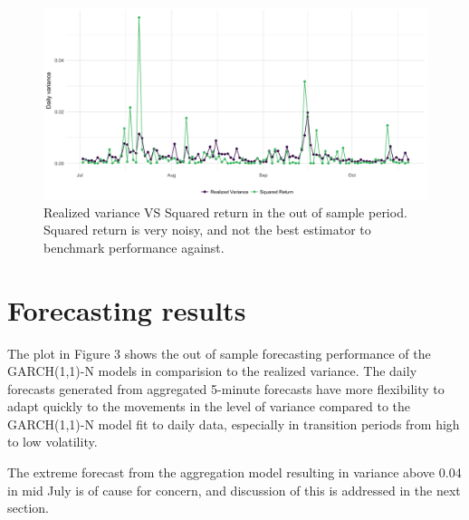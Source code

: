 \documentclass[10pt,twoside,printwatermark=false]{pinp}
\begin{document}
\begin{figure}
  \begin{center}
    \includegraphics[width=1.00\textwidth]{../../visualizations/compare_proxies} 
  \end{center}
  \caption{Realized variance VS Squared return in the out of sample period. Squared return is very noisy, and not the best estimator to benchmark performance against.}\label{fig}
\end{figure}

\section{Forecasting results}\label{forecasting-results}

The plot in Figure 3 shows the out of sample forecasting performance of
the GARCH(1,1)-N models in comparision to the realized variance. The
daily forecasts generated from aggregated 5-minute forecasts have more
flexibility to adapt quickly to the movements in the level of variance
compared to the GARCH(1,1)-N model fit to daily data, especially in
transition periods from high to low volatility.

The extreme forecast from the aggregation model resulting in variance
above 0.04 in mid July is of cause for concern, and discussion of this
is addressed in the next section.
\end{document}
